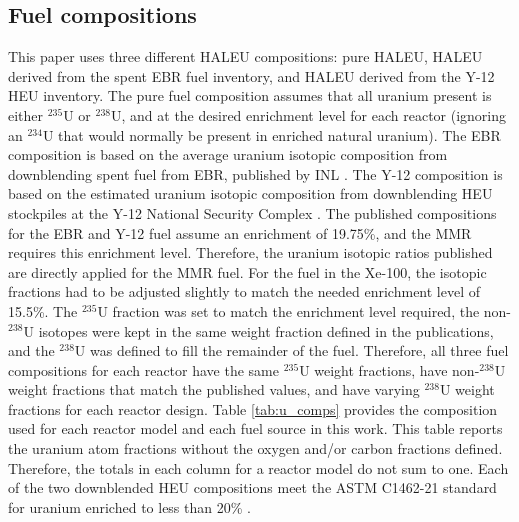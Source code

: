 \subsection{Fuel compositions}
This paper uses three different \gls*{HALEU} compositions: pure 
\gls*{HALEU}, \gls*{HALEU} derived from the spent \gls*{EBR} fuel inventory, 
and \gls*{HALEU} derived from the Y-12 \gls*{HEU} 
inventory. The pure fuel composition assumes that all uranium present is 
either $^{235}$U or $^{238}$U, and at the desired enrichment level for each 
reactor (ignoring an $^{234}$U that would normally be present in 
enriched natural uranium). The \gls*{EBR} 
composition is based on the average uranium isotopic composition from 
downblending spent fuel from \gls*{EBR}, published by \gls*{INL} 
\cite{vaden_isotopic_2018}. The Y-12 composition is based on the 
estimated uranium isotopic composition from downblending \gls*{HEU} 
stockpiles at the Y-12 National Security Complex \cite{nelson_foreign_2010}.
The published compositions for the \gls*{EBR} and Y-12 fuel 
assume an enrichment 
of 19.75\%, and the \gls*{MMR} requires this enrichment level. 
Therefore, the uranium isotopic ratios 
published are directly applied for the \gls*{MMR} fuel. For the fuel in the 
Xe-100, the isotopic fractions had to be adjusted slightly to match the 
needed enrichment level of 15.5\%. The $^{235}$U fraction was set to match 
the 
enrichment level required, the non-$^{238}$U isotopes were kept in the 
same weight fraction defined in the publications, and the $^{238}$U was 
defined to fill the remainder of the fuel. Therefore, all 
three fuel compositions for each 
reactor have the same $^{235}$U weight fractions, have non-$^{238}$U 
weight
fractions that match the published values, and have varying $^{238}$U 
weight fractions for each reactor design. Table \ref{tab:u_comps} 
provides the composition used for each reactor model and each fuel source 
in this work. This table reports the uranium atom fractions 
without the oxygen 
and/or carbon fractions defined. Therefore, the totals in each 
column for a reactor model do not sum to one. Each of the two 
downblended \gls*{HEU} compositions meet the ASTM C1462-21 
standard for 
uranium enriched to less than 20\% \cite{noauthor_standard_2021}.

